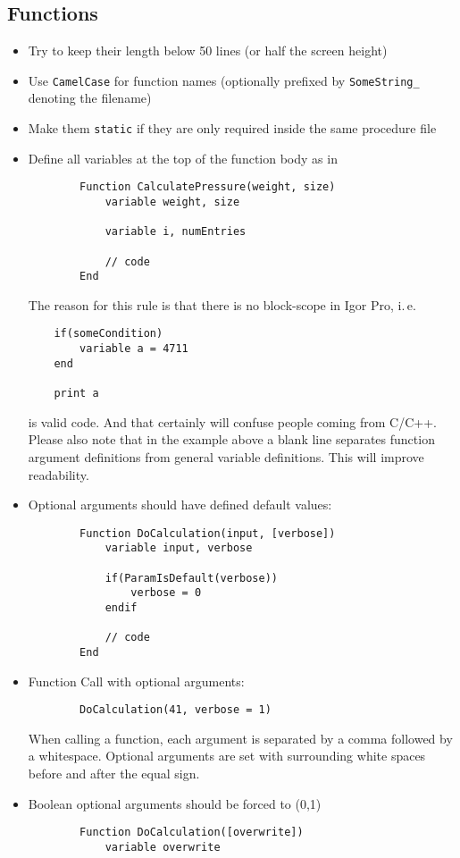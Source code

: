 \documentclass{scrartcl}
\begin{document}
\subsection{Functions}
\begin{itemize}
	\item Try to keep their length below 50 lines (or half the screen height)
%
	\item Use \texttt{CamelCase} for function names (optionally prefixed by \texttt{SomeString_} denoting the filename)
%
	\item Make them \texttt{static} if they are only required inside the same procedure file
%
	\item Define all variables at the top of the function body as in
	\begin{verbatim}
		Function CalculatePressure(weight, size)
			variable weight, size

			variable i, numEntries

			// code
		End
	\end{verbatim}
	The reason for this rule is that there is no block-scope in Igor Pro, i.\,e.
	\begin{verbatim}
	if(someCondition)
		variable a = 4711
	end

	print a
	\end{verbatim}
	is valid code. And that certainly will confuse people coming from C/C++.\\
%
	Please also note that in the example above a blank line separates function argument definitions from general variable definitions.
	This will improve readability.
%
	\item Optional arguments should have defined default values:
	\begin{verbatim}
		Function DoCalculation(input, [verbose])
			variable input, verbose

			if(ParamIsDefault(verbose))
				verbose = 0
			endif

			// code
		End
	\end{verbatim}
%
	\item Function Call with optional arguments:
	\begin{verbatim}
		DoCalculation(41, verbose = 1)
	\end{verbatim}
		When calling a function, each argument is separated by a comma followed by a whitespace.
		Optional arguments are set with surrounding white spaces before and after the equal sign.
%
	\item Boolean optional arguments should be forced to (0,1)
	\begin{verbatim}
		Function DoCalculation([overwrite])
			variable overwrite


\end{verbatim}
\end{itemize}
\end{document}
